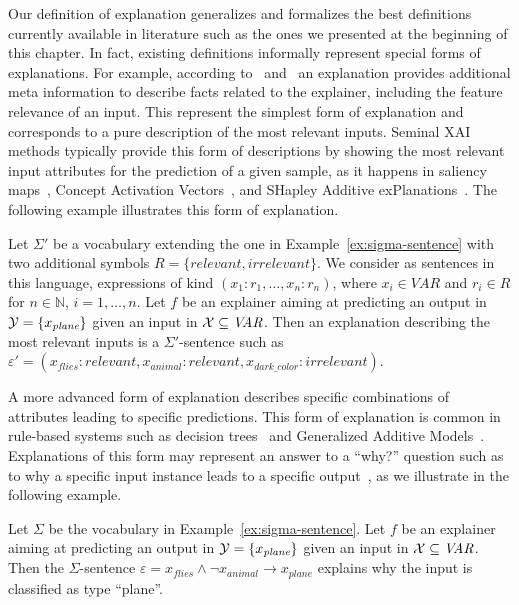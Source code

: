 Our definition of explanation generalizes and formalizes the best definitions currently available in literature such as the ones we presented at the beginning of this chapter. In fact, existing definitions informally represent special forms of explanations. For example, according to~\citet{Das2020OpportunitiesAC} and~\citet{palacio2021xai} an explanation provides additional meta information to describe facts related to the explainer, including the feature relevance of an input. This represent the simplest form of explanation and corresponds to a pure description of the most relevant inputs. Seminal XAI methods typically provide this form of descriptions by showing the most relevant input attributes for the prediction of a given sample, as it happens in saliency maps~\cite{simonyan2013deep}, Concept Activation Vectors~\cite{kim2018interpretability}, and SHapley Additive exPlanations~\cite{lundberg2017unified}. The following example illustrates this form of explanation.
\begin{example}
\label{ex:logrel}
Let $\Sigma'$ be a vocabulary extending the one in Example~\ref{ex:sigma-sentence} with two additional symbols $R=\{\textit{relevant}, \textit{irrelevant}\}$. We consider as sentences in this language, expressions of kind $(x_1:r_1,\ldots,x_n:r_n)$, where $x_i\in \textit{VAR}$ and $r_i\in R$ for $n\in\mathbb{N}$, $i=1,\ldots,n$. Let $f$ be an explainer aiming at predicting an output in $\mathcal{Y}=\{x_{\textit{plane}}\}$ given an input in $\mathcal{X}\subseteq\textit{VAR}$. Then an explanation describing the most relevant inputs is a $\Sigma'$-sentence such as $\varepsilon'=(x_{\textit{flies}}:\textit{relevant},x_{\textit{animal}}:\textit{relevant},x_{\textit{dark\_color}}:\textit{irrelevant})$.
\end{example}
A more advanced form of explanation describes specific combinations of attributes leading to specific predictions. This form of explanation is common in rule-based systems such as decision trees~\cite{breiman1984classification} and Generalized Additive Models~\cite{hastie2017generalized}. Explanations of this form may represent an answer to a ``why?'' question such as to why a specific input instance leads to a specific output~\cite{miller2019explanation,Das2020OpportunitiesAC}, as we illustrate in the following example.
\begin{example}
\label{ex:logsig}
    Let $\Sigma$ be the vocabulary in Example~\ref{ex:sigma-sentence}. Let $f$ be an explainer aiming at predicting an output in $\mathcal{Y}=\{x_{\textit{plane}}\}$ given an input in $\mathcal{X}\subseteq\textit{VAR}$. Then the $\Sigma$-sentence $\varepsilon = x_{\textit{flies}}\wedge\neg x_{\textit{animal}}\rightarrow x_{\textit{plane}}$ explains why the input is classified as type ``plane''.
\end{example}

